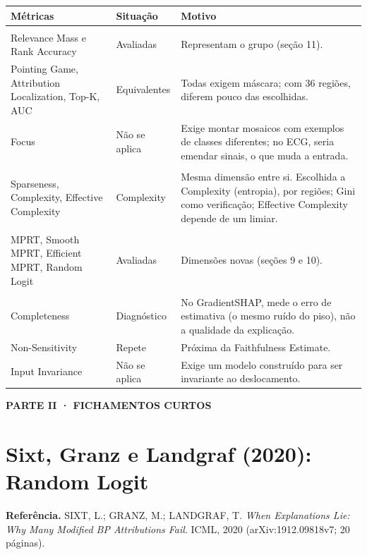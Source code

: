 \documentclass[11pt,a4paper]{article}
\newcommand{\partbar}[1]{\par\vspace{1.2em}\noindent\colorbox{black!80}{\parbox{\dimexpr\linewidth-2\fboxsep}{\color{white}\bfseries\sffamily\MakeUppercase{#1}}}\par\vspace{0.4em}}
\begin{document}
\begin{center}\small
\begin{tabularx}{\linewidth}{>{\raggedright\arraybackslash}p{3.6cm}>{\raggedright\arraybackslash}p{2.2cm}X}
\toprule
\textbf{Métricas} & \textbf{Situação} & \textbf{Motivo} \\
\midrule
\multicolumn{3}{l}{\textit{Localização}} \\
Relevance Mass e Rank Accuracy & Avaliadas & Representam o grupo (seção 11). \\
Pointing Game, Attribution Localization, Top-K, AUC & Equivalentes & Todas exigem máscara; com 36 regiões, diferem pouco das escolhidas. \\
Focus & Não se aplica & Exige montar mosaicos com exemplos de classes diferentes; no ECG, seria emendar sinais, o que muda a entrada. \\
\addlinespace
\multicolumn{3}{l}{\textit{Complexidade}} \\
Sparseness, Complexity, Effective Complexity & Complexity & Mesma dimensão entre si. Escolhida a Complexity (entropia), por regiões; Gini como verificação; Effective Complexity depende de um limiar. \\
\addlinespace
\multicolumn{3}{l}{\textit{Randomização}} \\
MPRT, Smooth MPRT, Efficient MPRT, Random Logit & Avaliadas & Dimensões novas (seções 9 e 10). \\
\addlinespace
\multicolumn{3}{l}{\textit{Axiomática}} \\
Completeness & Diagnóstico & No GradientSHAP, mede o erro de estimativa (o mesmo ruído do piso), não a qualidade da explicação. \\
Non-Sensitivity & Repete & Próxima da Faithfulness Estimate. \\
Input Invariance & Não se aplica & Exige um modelo construído para ser invariante ao deslocamento. \\
\bottomrule
\end{tabularx}
\end{center}

\partbar{Parte II · Fichamentos curtos}

\section{Sixt, Granz e Landgraf (2020): Random Logit}
\textbf{Referência.} SIXT, L.; GRANZ, M.; LANDGRAF, T. \textit{When Explanations Lie: Why Many Modified BP Attributions Fail}. ICML, 2020 (arXiv:1912.09818v7; 20 páginas).
\end{document}
